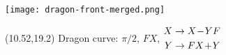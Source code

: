 \documentclass[final]{beamer}
\newcommand{\nt}{\negthinspace}
\newcommand{\m}{\nt-\nt}
\newcommand{\p}{\nt+\nt}
\begin{document}
\begin{frame}{}
\texttt{[image: dragon-front-merged.png]}
\begin{textblock}{20}(10.52,19.2)
Dragon curve: $\pi/2$, $FX$,
{\small
$\begin{aligned}
X &\to X\m YF \\
Y &\to FX\p Y
\end{aligned}$}
\end{textblock}
\end{frame}
\end{document}
